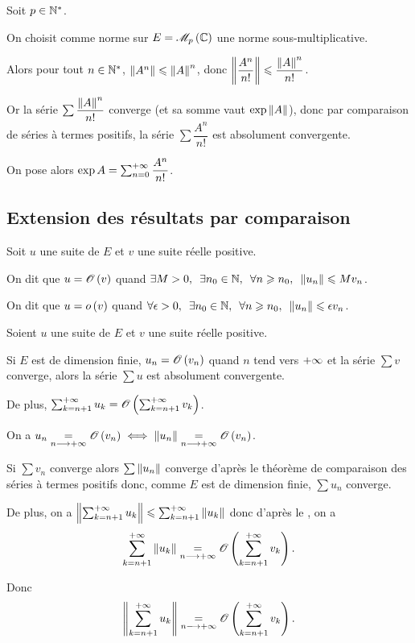 Soit \(p\in\mathbb{N}^*\).

On choisit comme norme sur \(E=\M{p}[\C]\) une norme sous-multiplicative.

Alors pour tout \(n\in\mathbb{N}^*\), \(\norme{A^n}\leq\norme{A}^n\), donc \(\norme{\dfrac{A^n}{n!}}\leq\dfrac{\norme{A}^n}{n!}\).

Or la série \(\sum\dfrac{\norme{A}^n}{n!}\) converge (et sa somme vaut \(\exp\norme{A}\)), donc par comparaison de séries à termes positifs, la série \(\sum\dfrac{A^n}{n!}\) est absolument convergente.

On pose alors \(\exp A=\sum_{n=0}^{+\infty}\dfrac{A^n}{n!}\).

\subsection{Extension des résultats par comparaison}

\begin{defi}
Soit \(u\) une suite de \(E\) et \(v\) une suite réelle positive.

On dit que \(u=\mathscr{O}\left(v\right)\) quand \(\quantifs{\exists M>0;\exists n_0\in\N;\forall n\geq n_0}\norme{u_n}\leq Mv_n\).

On dit que \(u=o\left(v\right)\) quand \(\quantifs{\forall\epsilon>0;\exists n_0\in\N;\forall n\geq n_0}\norme{u_n}\leq\epsilon v_n\).
\end{defi}

\begin{prop}
Soient \(u\) une suite de \(E\) et \(v\) une suite réelle positive.

Si \(E\) est de dimension finie, \(u_n=\mathscr{O}\left(v_n\right)\) quand \(n\) tend vers \(+\infty\) et la série \(\sum v\) converge, alors la série \(\sum u\) est absolument convergente.

De plus, \(\sum_{k=n+1}^{+\infty}u_k=\mathscr{O}\left(\sum_{k=n+1}^{+\infty}v_k\right)\).
\end{prop}

\begin{dem}
On a \(u_n\egqd{n\to\pinf}\O{v_n}\ssi\norme{u_n}\egqd{n\to\pinf}\O{v_n}\).

Si \(\sum v_n\) converge alors \(\sum\norme{u_n}\) converge d'après le théorème de comparaison des séries à termes positifs donc, comme \(E\) est de dimension finie, \(\sum u_n\) converge.

De plus, on a \(\norme{\sum_{k=n+1}^{\pinf}u_k}\leq\sum_{k=n+1}^{\pinf}\norme{u_k}\) donc d'après le , on a \[\sum_{k=n+1}^{\pinf}\norme{u_k}\egqd{n\to\pinf}\O{\sum_{k=n+1}^{\pinf}v_k}.\]

Donc \[\norme{\sum_{k=n+1}^{\pinf}u_k}\egqd{n\to\pinf}\O{\sum_{k=n+1}^{\pinf}v_k}.\]
\end{dem}

